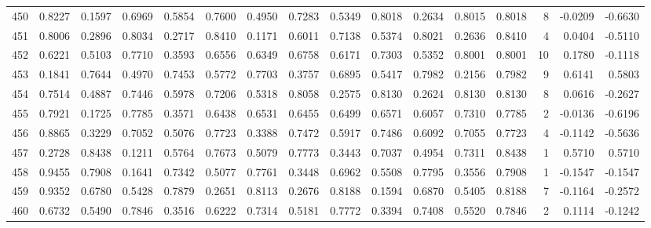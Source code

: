 \begin{tabular}{lrrrrrrrrrrrrrrr}
450 &      0.8227 &  0.1597 &  0.6969 &  0.5854 &  0.7600 &  0.4950 &  0.7283 &  0.5349 &  0.8018 &  0.2634 &   0.8015 &     0.8018 &      8 &                   -0.0209 &                    -0.6630 \\
451 &      0.8006 &  0.2896 &  0.8034 &  0.2717 &  0.8410 &  0.1171 &  0.6011 &  0.7138 &  0.5374 &  0.8021 &   0.2636 &     0.8410 &      4 &                    0.0404 &                    -0.5110 \\
452 &      0.6221 &  0.5103 &  0.7710 &  0.3593 &  0.6556 &  0.6349 &  0.6758 &  0.6171 &  0.7303 &  0.5352 &   0.8001 &     0.8001 &     10 &                    0.1780 &                    -0.1118 \\
453 &      0.1841 &  0.7644 &  0.4970 &  0.7453 &  0.5772 &  0.7703 &  0.3757 &  0.6895 &  0.5417 &  0.7982 &   0.2156 &     0.7982 &      9 &                    0.6141 &                     0.5803 \\
454 &      0.7514 &  0.4887 &  0.7446 &  0.5978 &  0.7206 &  0.5318 &  0.8058 &  0.2575 &  0.8130 &  0.2624 &   0.8130 &     0.8130 &      8 &                    0.0616 &                    -0.2627 \\
455 &      0.7921 &  0.1725 &  0.7785 &  0.3571 &  0.6438 &  0.6531 &  0.6455 &  0.6499 &  0.6571 &  0.6057 &   0.7310 &     0.7785 &      2 &                   -0.0136 &                    -0.6196 \\
456 &      0.8865 &  0.3229 &  0.7052 &  0.5076 &  0.7723 &  0.3388 &  0.7472 &  0.5917 &  0.7486 &  0.6092 &   0.7055 &     0.7723 &      4 &                   -0.1142 &                    -0.5636 \\
457 &      0.2728 &  0.8438 &  0.1211 &  0.5764 &  0.7673 &  0.5079 &  0.7773 &  0.3443 &  0.7037 &  0.4954 &   0.7311 &     0.8438 &      1 &                    0.5710 &                     0.5710 \\
458 &      0.9455 &  0.7908 &  0.1641 &  0.7342 &  0.5077 &  0.7761 &  0.3448 &  0.6962 &  0.5508 &  0.7795 &   0.3556 &     0.7908 &      1 &                   -0.1547 &                    -0.1547 \\
459 &      0.9352 &  0.6780 &  0.5428 &  0.7879 &  0.2651 &  0.8113 &  0.2676 &  0.8188 &  0.1594 &  0.6870 &   0.5405 &     0.8188 &      7 &                   -0.1164 &                    -0.2572 \\
460 &      0.6732 &  0.5490 &  0.7846 &  0.3516 &  0.6222 &  0.7314 &  0.5181 &  0.7772 &  0.3394 &  0.7408 &   0.5520 &     0.7846 &      2 &                    0.1114 &                    -0.1242 \\

\end{tabular}
